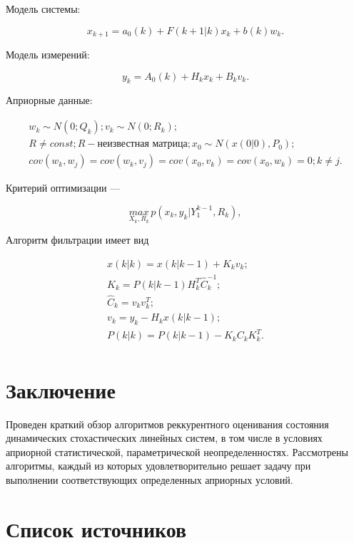 \documentclass[a4paper,12pt]{article}
\begin{document}
Модель системы:

\[ x_{k+1} = a_0(k) + F(k+1|k) x_k + b(k) w_k . \]

Модель измерений:

\[ y_k = A_0(k) + H_k x_k + B_k v_k . \]

Априорные данные:

\[ 
\begin{array}{l}
	w_k \sim N(0; Q_k); v_k \sim N(0; R_k);\\
	R \ne const; R - \mbox{неизвестная матрица}; x_0 \sim N(x(0|0), P_0);\\
	cov(w_k, w_j) = cov(w_k, v_j) = cov(x_0, v_k) = cov(x_0, w_k) = 0; k \ne j.
\end{array}
\]

Критерий оптимизации ---

\[ \underset{X_k, R_k}{max}\, p(x_k, y_k | Y_1^{k-1}, R_k), \]

Алгоритм фильтрации имеет вид

\[ 
	\begin{array}{l}
		x(k|k) = x(k|k-1) + K_k v_k; \\
		K_k = P(k|k-1) H_k^T \hat{C}_k^{-1}; \\
		\hat {C}_k = v_k v_k^T; \\
		v_k = y_k - H_k x(k|k-1); \\
		P(k|k) = P(k|k-1) - K_k C_k K_k^T. \\
	\end{array}
\]

\section*{Заключение}

Проведен краткий обзор алгоритмов реккурентного оценивания состояния
динамических стохастических линейных систем, в том числе в условиях априорной
статистической, параметрической неопределенностях. Рассмотрены алгоритмы,
каждый из которых удовлетворительно решает задачу при выполнении
соответствующих определенных априорных условий.

\section*{Список источников}
\end{document}
